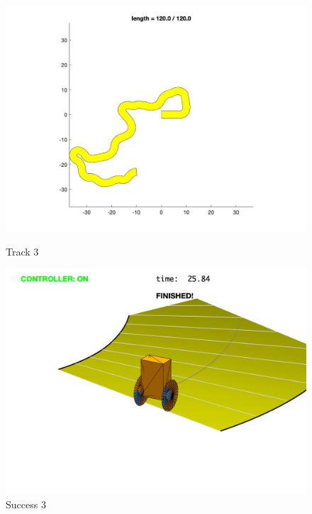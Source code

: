 \documentclass{article}
\begin{document}
\begin{figure}[H]
\centering
\begin{minipage}{.5\textwidth}
	\centering
	\includegraphics[width=.8\linewidth]{track 3.jpg}
	\caption{Track 3}
	\end{minipage}%
\begin{minipage}{.5\textwidth}
	\centering
	\includegraphics[width=.8\linewidth]{track 3r.jpg}
	\caption{Success 3}
\end{minipage}
\end{figure}
\end{document}
